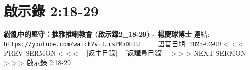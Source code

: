 \documentclass{book}
\begin{document}
\section{啟示錄 2:18-29}
\label{sec:fJrsPMmDHtU}
\textbf{紛亂中的堅守︰推雅推喇教會 (啟示錄2\_18-29) - 楊慶球博士}
\newline
\newline
連結: \href{https://youtube.com/watch?v=fJrsPMmDHtU}{\texttt{https://youtube.com/watch?v=fJrsPMmDHtU}} ~~~~ 語音日期: 2025-02-09
\newline
\newline
\hyperref[sec:l8BFPdIOADs]{< < < PREV SERMON < < <}
~
\hyperlink{toc}{[返主目錄]}
~
\hyperref[ch:preacher6]{[返講員目錄]}
~
\hyperref[sec:rP3BCIuRFDw]{> > > NEXT SERMON > > >}
\newline
\newline
啟示錄 2:18-29
\newline
\end{document}
